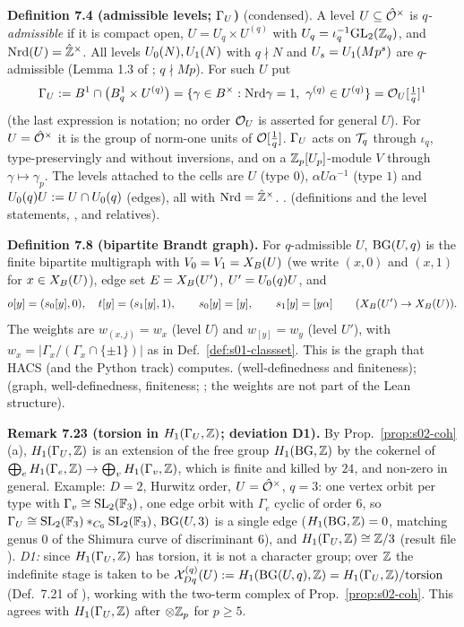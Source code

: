 \medskip
\noindent{}\label{rpt:def:s02-GU}\textbf{Definition 7.4 (admissible levels; $\Gamma_U$)} (condensed).
A level $U\subseteq\hat{\mathcal{O}}^\times$ is \emph{$q$-admissible} if it is compact open, $U=U_q\times U^{(q)}$ with
$U_q=\iota_q^{-1}\mathrm{GL}_2(\mathbb{Z}_q)$, and $\mathrm{Nrd}(U)=\hat{\mathbb{Z}}^\times$. All levels $U_0(N),U_1(N)$ with $q\nmid N$ and
$U_s=U_1(Mp^s)$ are $q$-admissible (Lemma 1.3 of \mainpdf; $q\nmid Mp$). For such $U$ put
\[\Gamma_U:=B^1\cap\big(B^1_q\times U^{(q)}\big)=\{\gamma\in B^\times:\mathrm{Nrd}\gamma=1,\ \gamma^{(q)}\in U^{(q)}\}=\mathcal{O}_U[\tfrac1q]^1\]
(the last expression is notation; no order $\mathcal{O}_U$ is asserted for general $U$). For $U=\hat{\mathcal{O}}^\times$ it is the group of norm-one units
of $\mathcal{O}[\frac1q]$. $\Gamma_U$ acts on $\mathcal{T}_q$ through $\iota_q$, type-preservingly and without inversions, and on a $\mathbb{Z}_p[U_p]$-module $V$
through $\gamma\mapsto\gamma_p$. The levels attached to the cells are $U$ (type $0$), $\alpha U\alpha^{-1}$ (type $1$) and
$U_0(q)U:=U\cap U_0(q)$ (edges), all with $\mathrm{Nrd}=\hat{\mathbb{Z}}^\times$. \stproved{}. \stformal{} (definitions and the level statements,
,  and relatives).

\medskip
\noindent{}\label{rpt:def:s02-BG}\textbf{Definition 7.8 (bipartite Brandt graph).}
For $q$-admissible $U$, $\mathrm{BG}(U,q)$ is the finite bipartite multigraph with $V_0=V_1=X_B(U)$ (we write $(x,0)$ and $(x,1)$ for
$x\in X_B(U)$), edge set $E=X_B(U')$, $U'=U_0(q)U$, and
\[o[y]=(s_0[y],0),\quad t[y]=(s_1[y],1),\qquad s_0[y]=[y],\qquad s_1[y]=[y\alpha]\qquad(X_B(U')\to X_B(U)).\]
The weights are $w_{(x,j)}=w_x$ (level $U$) and $w_{[y]}=w_y$ (level $U'$), with $w_x=|\Gamma_x/(\Gamma_x\cap\{\pm1\})|$ as in
Def.~\ref{def:s01-classset}. This is the graph that HACS (and the Python track) computes.
\stproved{} (well-definedness and finiteness); \stformal{} (graph, well-definedness, finiteness; ; the weights
are not part of the Lean structure).

\medskip
\noindent{}\label{rpt:rem:s02-torsion}\textbf{Remark 7.23 (torsion in $H_1(\Gamma_U,\mathbb{Z})$; deviation D1).}
By Prop.~\ref{prop:s02-coh}(a), $H_1(\Gamma_U,\mathbb{Z})$ is an extension of the free group $H_1(\mathrm{BG},\mathbb{Z})$ by the cokernel of
$\bigoplus_eH_1(\Gamma_e,\mathbb{Z})\to\bigoplus_vH_1(\Gamma_v,\mathbb{Z})$, which is finite and killed by $24$, and non-zero in general. \stcomp{}
Example: $D=2$, Hurwitz order, $U=\hat{\mathcal{O}}^\times$, $q=3$: one vertex orbit per type with $\Gamma_v\cong\mathrm{SL}_2(\mathbb{F}_3)$, one edge orbit with
$\Gamma_e$ cyclic of order $6$, so $\Gamma_U\cong\mathrm{SL}_2(\mathbb{F}_3)*_{C_6}\mathrm{SL}_2(\mathbb{F}_3)$, $\mathrm{BG}(U,3)$ is a single edge ($H_1(\mathrm{BG},\mathbb{Z})=0$, matching genus $0$ of
the Shimura curve of discriminant $6$), and $H_1(\Gamma_U,\mathbb{Z})\cong\mathbb{Z}/3$ (result file ).
\emph{D1:} since $H_1(\Gamma_U,\mathbb{Z})$ has torsion, it is not a character group; over $\mathbb{Z}$ the indefinite stage is taken to be
$\mathcal{X}^{(q)}_{Dq}(U):=H_1(\mathrm{BG}(U,q),\mathbb{Z})=H_1(\Gamma_U,\mathbb{Z})/\mathrm{torsion}$ (Def.~7.21 of \mainpdf), working with the two-term complex of
Prop.~\ref{prop:s02-coh}. This agrees with $H_1(\Gamma_U,\mathbb{Z})$ after $\otimes\mathbb{Z}_p$ for $p\ge5$.

